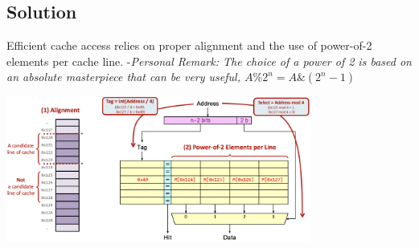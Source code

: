 \subsection{Solution}
Efficient cache access relies on proper alignment and the use of power-of-2 elements per cache line.
-\textit{Personal Remark: The choice of a power of 2 is based on an absolute masterpiece that can be very useful, $A \% 2^n = A \& (2^n -1)$}
\begin{center}
    \includegraphics[width=0.75\textwidth]{chapters/chapter3a/images/solution.png}
\end{center}
